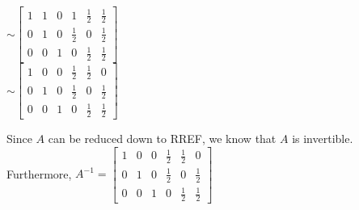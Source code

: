 \documentclass{report}
\begin{document}
$\sim \begin{bmatrix} 
    1 & 1 & 0 & 1 & \frac{1}{2} & \frac{1}{2} \\
    0 & 1 & 0 & \frac{1}{2} & 0 & \frac{1}{2} \\ 
    0 & 0 & 1 & 0 & \frac{1}{2} & \frac{1}{2} 
\end{bmatrix}$\\\vspace{3mm}
$\sim \begin{bmatrix} 
    1 & 0 & 0 & \frac{1}{2} & \frac{1}{2} & 0 \\
    0 & 1 & 0 & \frac{1}{2} & 0 & \frac{1}{2} \\ 
    0 & 0 & 1 & 0 & \frac{1}{2} & \frac{1}{2} 
\end{bmatrix}$
\begin{center}
    Since $A$ can be reduced down to RREF, we know that $A$ is invertible.\\\vspace{3mm}
    Furthermore, $A^{-1} = \begin{bmatrix} 
        1 & 0 & 0 & \frac{1}{2} & \frac{1}{2} & 0 \\
        0 & 1 & 0 & \frac{1}{2} & 0 & \frac{1}{2} \\ 
        0 & 0 & 1 & 0 & \frac{1}{2} & \frac{1}{2} 
    \end{bmatrix}$
\end{center}
\clearpage
\end{document}
